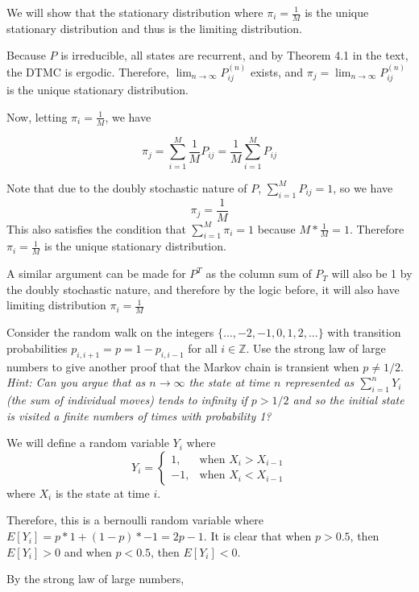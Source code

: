 \documentclass[10pt,a4paper]{exam}
\begin{document}
\begin{questions}
\begin{solution}
We will show that the stationary distribution where $\pi_i = \frac{1}{M}$ is the unique stationary distribution and thus is the limiting distribution. 

Because $P$ is irreducible, all states are recurrent, and by Theorem 4.1 in the text, the DTMC is ergodic. Therefore, $\lim_{n \to \infty} P_{ij}^{(n)}$ exists, and $\pi_j = \lim_{n \to \infty} P_{ij}^{(n)}$ is the unique stationary distribution.

Now, letting $\pi_i = \frac{1}{M}$, we have

$$\pi_j = \sum_{i=1}^M  \frac{1}{M} P_{ij} = \frac{1}{M}\sum_{i=1}^M P_{ij}$$

Note that due to the doubly stochastic nature of $P$, $\sum_{i = 1}^M P_{ij} = 1$, so we have
$$\pi_j = \frac{1}{M}$$ This also satisfies the condition that $\sum_{i=1}^M \pi_i =1$ because $M * \frac{1}{M} = 1$. Therefore $\pi_i = \frac{1}{M}$ is the unique stationary distribution.

A similar argument can be made for $P^T$ as the column sum of $P_T$ will also be 1 by the doubly stochastic nature, and therefore by the logic before, it will also have limiting distribution $\pi_i = \frac{1}{M}$
\end{solution}


\question Consider the random walk on the integers $\{...,-2,-1,0,1,2,...\}$ with transition probabilities $p_{i,i+1} = p =  1 - p_{i,i-1}$ for all $i \in \mathbb{Z}$. Use the strong law of large numbers to give another proof that the Markov chain is transient when $p \neq 1/2$. \textit{Hint: Can you argue that as $n \rightarrow \infty$ the state at time $n$ represented as $\sum_{i=1}^nY_i$ (the sum of individual moves) tends to infinity if $p > 1/2$ and so the initial state is visited a finite numbers of times with probability 1?}

\begin{solution}
We will define a random variable $Y_i$ where $$Y_i = \begin{cases}1, & \text{when } X_i > X_{i-1}\\
-1, &\text{when }  X_i < X_{i-1}\end{cases}$$ where $X_i$ is the state at time $i$.

Therefore, this is a bernoulli random variable where $E[Y_i] = p*1 + (1-p)*-1 = 2p - 1$. It is clear that when $p > 0.5$, then $E[Y_i] > 0$ and when $p < 0.5$, then $E[Y_i] < 0$.

By the strong law of large numbers,


\end{solution}
\end{questions}
\end{document}
